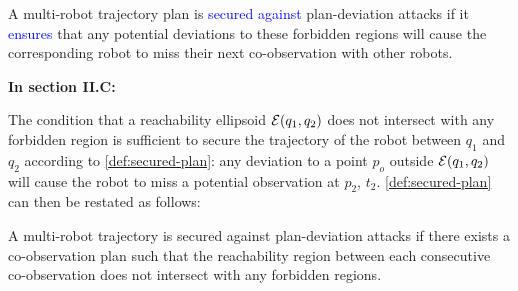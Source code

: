 \documentclass{article}
\newcommand{\new}[1]{\textcolor{blue}{#1}}
\newcommand{\news}{\color{blue}}
\begin{document}
\setcounter{definition}{0}
\begin{definition}\label{def:secured-plan}
  A multi-robot trajectory plan is \new{secured against} plan-deviation attacks if it \new{ensures} that any potential deviations to these forbidden regions will cause the corresponding robot to miss their next co-observation with other robots. 
\end{definition}
\setcounter{definition}{3}
\setcounter{remark}{1}

\textbf{In section II.C:} 

{\news The condition that a reachability ellipsoid $\mathcal{E}(q_1,q_2)$ does not intersect with any forbidden region is sufficient to secure the trajectory of the robot between $q_1$ and $q_2$ according to \cref{def:secured-plan}: any deviation to a point $p_o$ outside $\mathcal{E}(q_1,q_2)$ will cause the robot to miss a potential observation at $p_2$, $t_2$. \cref{def:secured-plan} can then be restated as follows:
\begin{definition}\label{rmk:revised-security}
  A multi-robot trajectory is secured against plan-deviation attacks if there exists a co-observation plan such that the reachability region between each consecutive co-observation does not intersect with any forbidden regions.
\end{definition}
}
\setcounter{figure}{3}
\end{document}
